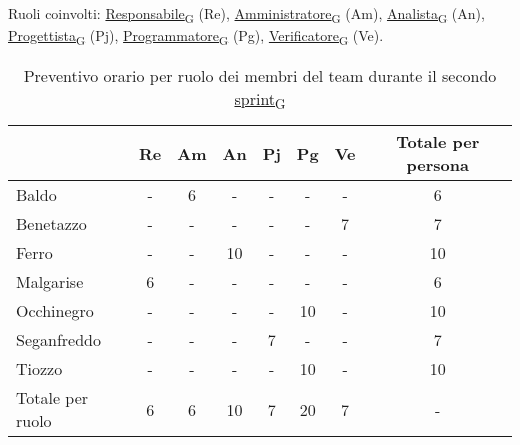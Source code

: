 Ruoli coinvolti: \href{https://7last.github.io/docs/rtb/documentazione-interna/glossario\#responsabile}{Responsabile\textsubscript{G}} (Re), \href{https://7last.github.io/docs/rtb/documentazione-interna/glossario\#amministratore}{Amministratore\textsubscript{G}} (Am), \href{https://7last.github.io/docs/rtb/documentazione-interna/glossario\#analista}{Analista\textsubscript{G}} (An), \href{https://7last.github.io/docs/rtb/documentazione-interna/glossario\#progettista}{Progettista\textsubscript{G}} (Pj), \href{https://7last.github.io/docs/rtb/documentazione-interna/glossario\#programmatore}{Programmatore\textsubscript{G}} (Pg), \href{https://7last.github.io/docs/rtb/documentazione-interna/glossario\#verificatore}{Verificatore\textsubscript{G}} (Ve).
\begin{table}[!h]
	\centering
	\begin{tabular}{ | l | c | c | c | c | c | c | c | }
		\hline
		\textbf{}        & \textbf{Re} & \textbf{Am} & \textbf{An} & \textbf{Pj} & \textbf{Pg} & \textbf{Ve} & \textbf{Totale per persona} \\
		\hline
		Baldo            & -           & 6           & -           & -           & -           & -           & 6                           \\
		Benetazzo        & -           & -           & -           & -           & -           & 7           & 7                           \\
		Ferro            & -           & -           & 10          & -           & -           & -           & 10                          \\
		Malgarise        & 6           & -           & -           & -           & -           & -           & 6                           \\
		Occhinegro       & -           & -           & -           & -           & 10          & -           & 10                          \\
		Seganfreddo      & -           & -           & -           & 7           & -           & -           & 7                           \\
		Tiozzo           & -           & -           & -           & -           & 10          & -           & 10                          \\
		\hline
		Totale per ruolo & 6           & 6           & 10          & 7           & 20          & 7           & -                           \\
		\hline
	\end{tabular}
	\caption{Preventivo orario per ruolo dei membri del team durante il secondo \href{https://7last.github.io/docs/rtb/documentazione-interna/glossario\#sprint}{sprint\textsubscript{G}}}
	
\end{table}

